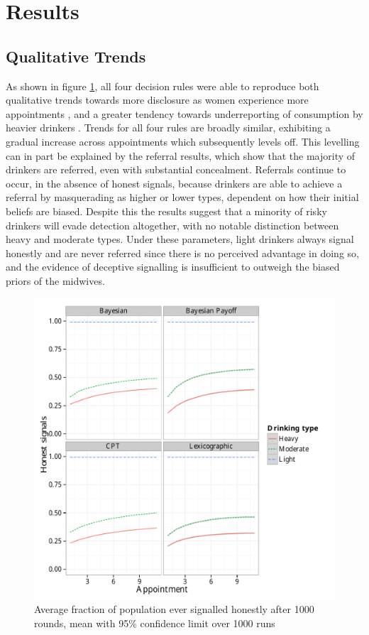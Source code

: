 \section{Results}
\label{sec:results}


\subsection{Qualitative Trends}
\label{sub:qt_results}

As shown in figure \ref{fig:honest_signals}, all four decision rules were able to reproduce both qualitative trends towards more disclosure as women experience more appointments \citep{Phillips2007}, and a greater tendency towards underreporting of consumption by heavier drinkers \citep{Alvik2006}.  Trends for all four rules are broadly similar, exhibiting a gradual increase across appointments which subsequently levels off. This levelling can in part be explained by the referral results, which show that the majority of drinkers are referred, even with substantial concealment. Referrals continue to occur, in the absence of honest signals, because drinkers are able to achieve a referral by masquerading as higher or lower types, dependent on how their initial beliefs are biased. Despite this the results suggest that a minority of risky drinkers will evade detection altogether, with no notable distinction between heavy and moderate types. Under these parameters, light drinkers always signal honestly and are never referred since there is no perceived advantage in doing so, and the evidence of deceptive signalling is insufficient to outweigh the biased priors of the midwives. 

\begin{figure}[h]
\includegraphics[width=119mm]{figures/honesty_plot}
\caption{Average fraction of population ever signalled honestly after 1000 rounds, mean with 95\% confidence limit over 1000 runs\label{fig:honest_signals}}
\end{figure}

